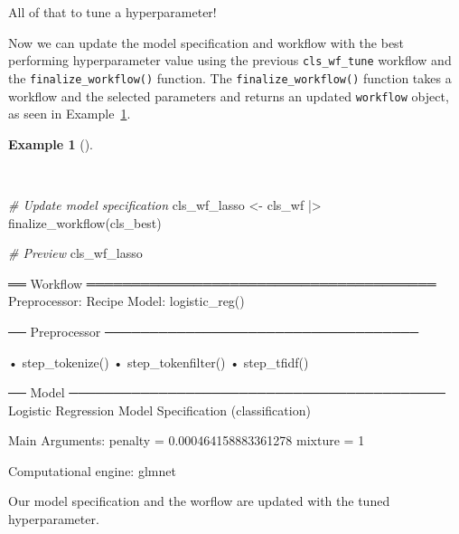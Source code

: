 \documentclass[
  letterpaper,
]{book}
\newenvironment{Shaded}{\begin{snugshade}}{\end{snugshade}}
\newcommand{\CommentTok}[1]{\textcolor[rgb]{0.00,0.00,0.00}{\textit{#1}}}
\newcommand{\FunctionTok}[1]{\textcolor[rgb]{0.00,0.00,0.00}{#1}}
\newcommand{\NormalTok}[1]{\textcolor[rgb]{0.00,0.00,0.00}{#1}}
\newcommand{\OtherTok}[1]{\textcolor[rgb]{0.00,0.00,0.00}{#1}}
\newcommand{\SpecialCharTok}[1]{\textcolor[rgb]{0.00,0.00,0.00}{#1}}
\theoremstyle{definition}
\newtheorem{example}{Example}[chapter]
\theoremstyle{remark}
\begin{document}
All of that to tune a hyperparameter!

Now we can update the model specification and workflow with the best
performing hyperparameter value using the previous
\texttt{cls\_wf\_tune} workflow and the \texttt{finalize\_workflow()}
function. The \texttt{finalize\_workflow()} function takes a workflow
and the selected parameters and returns an updated \texttt{workflow}
object, as seen in
Example~\ref{exm-predict-class-tune-hyperparameters-update-workflow}.

\begin{example}[]\protect\hypertarget{exm-predict-class-tune-hyperparameters-update-workflow}{}\label{exm-predict-class-tune-hyperparameters-update-workflow}

~

\begin{Shaded}
\begin{Highlighting}[]
\CommentTok{\# Update model specification}
\NormalTok{cls\_wf\_lasso }\OtherTok{\textless{}{-}}
\NormalTok{  cls\_wf }\SpecialCharTok{|\textgreater{}}
  \FunctionTok{finalize\_workflow}\NormalTok{(cls\_best)}

\CommentTok{\# Preview}
\NormalTok{cls\_wf\_lasso}
\end{Highlighting}
\end{Shaded}

\begin{Shaded}
\begin{Highlighting}[]
\NormalTok{══ Workflow ═══════════════════════════════════════}
\NormalTok{Preprocessor: Recipe}
\NormalTok{Model: logistic\_reg()}

\NormalTok{── Preprocessor ───────────────────────────────────}

\NormalTok{• step\_tokenize()}
\NormalTok{• step\_tokenfilter()}
\NormalTok{• step\_tfidf()}

\NormalTok{── Model ──────────────────────────────────────────}
\NormalTok{Logistic Regression Model Specification (classification)}

\NormalTok{Main Arguments:}
\NormalTok{  penalty = 0.000464158883361278}
\NormalTok{  mixture = 1}

\NormalTok{Computational engine: glmnet}
\end{Highlighting}
\end{Shaded}

\end{example}

Our model specification and the worflow are updated with the tuned
hyperparameter.
\end{document}
